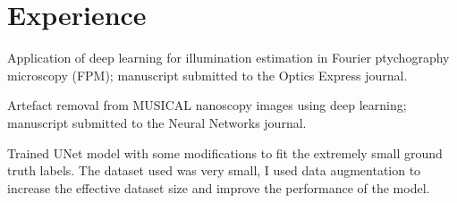\documentclass[]{deedy-resume-openfont}
\begin{document}
\begin{minipage}[t]{0.28\textwidth}

\sectionsep

%
%

\end{minipage} 
\hfill
\begin{minipage}[t]{0.7\textwidth} 

\section{Experience}

\vspace{\topsep} %
\begin{tightemize}
\item Application of deep learning for illumination estimation in Fourier ptychography microscopy (FPM); manuscript submitted to the Optics Express journal.
\item Artefact removal from MUSICAL nanoscopy images using deep learning; manuscript submitted to the Neural Networks journal.
\end{tightemize}
\sectionsep

\begin{tightemize}
\item Trained UNet model with some modifications to fit the extremely small ground truth labels. The dataset used was very small, I used data augmentation to increase the effective dataset size and improve the performance of the model. 
\end{tightemize}
\sectionsep


\end{minipage}
\end{document}

